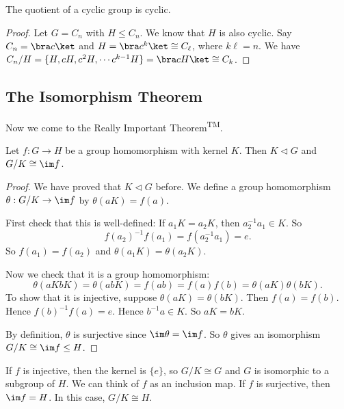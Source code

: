 \documentclass[a4paper]{article}
\begin{document}
\begin{prop}
  The quotient of a cyclic group is cyclic.
\end{prop}

\begin{proof}
  Let $G = C_n$ with $H\leq C_n$. We know that $H$ is also cyclic. Say $C_n = \bra c\ket$ and $H = \bra c^k \ket \cong C_\ell$, where $k\ell = n$. We have $C_n/H = \{H, cH, c^2H, \cdots c^{k - 1}H\}=\bra cH\ket \cong C_k$.
\end{proof}

\subsection{The Isomorphism Theorem}
Now we come to the Really Important Theorem\textsuperscript{TM}.
\begin{thm}
  Let $f:G\to H$ be a group homomorphism with kernel $K$. Then $K\lhd G$ and $G/K\cong \im f$.
\end{thm}

\begin{proof}
  We have proved that $K\lhd G$ before. We define a group homomorphism $\theta: G/K\to \im f$ by $\theta(aK) = f(a)$.

  First check that this is well-defined: If $a_1K = a_2K$, then $a_2^{-1}a_1\in K$. So
  \[
    f(a_2)^{-1}f(a_1) = f(a_2^{-1}a_1) = e.
  \]
  So $f(a_1) = f(a_2)$ and $\theta(a_1K) = \theta(a_2 K)$.

  Now we check that it is a group homomorphism:
  \[
    \theta(aKbK) = \theta(abK) = f(ab) = f(a)f(b) = \theta(aK) \theta(bK).
  \]
  To show that it is injective, suppose $\theta(aK) = \theta(bK)$. Then $f(a) = f(b)$. Hence $f(b)^{-1}f(a) = e$. Hence $b^{-1}a \in K$. So $aK = bK$.

  By definition, $\theta$ is surjective since $\im \theta = \im f$. So $\theta$ gives an isomorphism $G/K \cong \im f \leq H$.
\end{proof}
If $f$ is injective, then the kernel is $\{e\}$, so $G/K\cong G$ and $G$ is isomorphic to a subgroup of $H$. We can think of $f$ as an inclusion map. If $f$ is surjective, then $\im f = H$. In this case, $G/K \cong H$.
\end{document}
